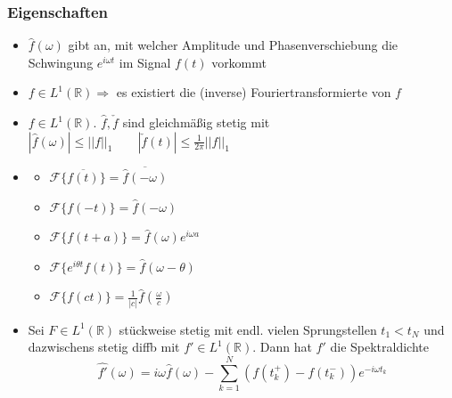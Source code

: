 \begin{sectionbox}
    \subsubsection{Eigenschaften}
    \begin{itemize}
        \item $\hat f(\omega)$ gibt an, mit welcher Amplitude und Phasenverschiebung die Schwingung $e^{i\omega t}$ im Signal $f(t)$ vorkommt
        \item $f\in L^1(\mathbb R) \Longrightarrow$ es existiert die (inverse) Fouriertransformierte von $f$
        \item $f\in L^1(\mathbb R)$. $\hat f, \check f$ sind gleichmäßig stetig mit \\
        $|\hat f(\omega)| \le ||f||_1 \qquad |\check f(t)| \le \frac{1}{2\pi}||f||_1$
        \item \begin{itemize}
            \item $\mathcal F\{\overline{f(t)}\}=\overline{\hat f(-\omega)}$
            \item $\mathcal F\{f(-t)\}=\hat f(-\omega)$
            \item $\mathcal F\{f(t+a)\}=\hat f(\omega)e^{i\omega a}$
            \item $\mathcal F\{e^{i\theta t}f(t)\}=\hat f(\omega - \theta)$
            \item $\mathcal F\{f(ct)\}=\frac{1}{|c|}\hat f(\frac{\omega}{c})$
        \end{itemize}
        \item Sei $F\in L^1(\mathbb R)$ stückweise stetig mit endl. vielen Sprungstellen $t_1 < t_N$ und dazwischens stetig diffb mit $f' \in L^1(\mathbb R)$. 
        Dann hat $f'$ die Spektraldichte
        \begin{equation*}
            \hat{f'}(\omega) = i\omega \hat f(\omega) - \sum_{k=1}^{N}(f(t_k^+)-f(t_k^-))e^{-i\omega t_k}
        \end{equation*}
    \end{itemize}
\end{sectionbox}